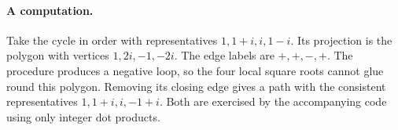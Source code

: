 \paragraph{A computation.}
Take the cycle in order with representatives $1,1+i,i,1-i$. Its projection is the polygon with vertices $1,2i,-1,-2i$. The edge labels are $+,+,-,+$. The procedure produces a negative loop, so the four local square roots cannot glue round this polygon. Removing its closing edge gives a path with the consistent representatives $1,1+i,i,-1+i$. Both are exercised by the accompanying code using only integer dot products.


